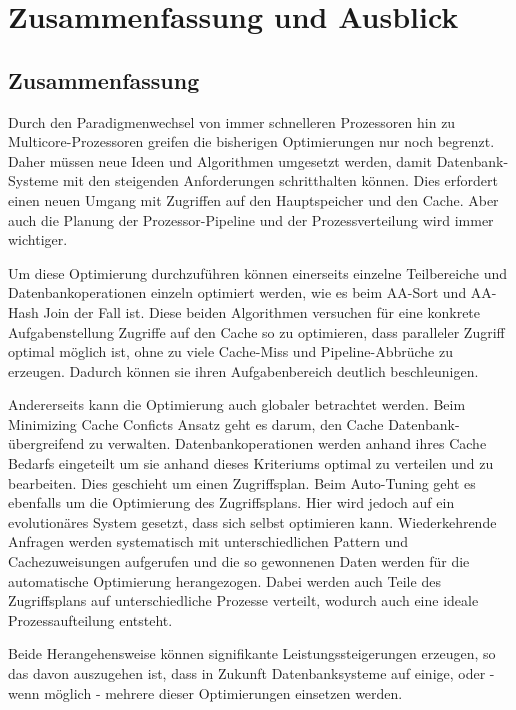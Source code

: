 \chapter{Zusammenfassung und Ausblick}
\label{sec:Zusammenfassung-Ausblick}

\section{Zusammenfassung}
\label{sec:Zusammenfassung}

Durch den Paradigmenwechsel von immer schnelleren Prozessoren hin zu Multicore-Prozessoren greifen die bisherigen Optimierungen nur noch begrenzt. Daher müssen neue Ideen und Algorithmen umgesetzt werden, damit Datenbank-Systeme mit den steigenden Anforderungen schritthalten können. Dies erfordert einen neuen Umgang mit Zugriffen auf den Hauptspeicher und den Cache. Aber auch die Planung der Prozessor-Pipeline und der Prozessverteilung wird immer wichtiger.

Um diese Optimierung durchzuführen können einerseits einzelne Teilbereiche und Datenbankoperationen einzeln optimiert werden, wie es beim AA-Sort und AA-Hash Join der Fall ist. Diese beiden Algorithmen versuchen für eine konkrete Aufgabenstellung Zugriffe auf den Cache so zu optimieren, dass paralleler Zugriff optimal möglich ist, ohne zu viele Cache-Miss und Pipeline-Abbrüche zu erzeugen. Dadurch können sie ihren Aufgabenbereich deutlich beschleunigen.

Andererseits kann die Optimierung auch globaler betrachtet werden. Beim Minimizing Cache Conficts Ansatz geht es darum, den Cache Datenbank-übergreifend zu verwalten. Datenbankoperationen werden anhand ihres Cache Bedarfs eingeteilt um sie anhand dieses Kriteriums optimal zu verteilen und zu bearbeiten. Dies geschieht um einen Zugriffsplan. Beim Auto-Tuning geht es ebenfalls um die Optimierung des Zugriffsplans. Hier wird jedoch auf ein evolutionäres System gesetzt, dass sich selbst optimieren kann. Wiederkehrende Anfragen werden systematisch mit unterschiedlichen Pattern und Cachezuweisungen aufgerufen und die so gewonnenen Daten werden für die automatische Optimierung herangezogen. Dabei werden auch Teile des Zugriffsplans auf unterschiedliche Prozesse verteilt, wodurch auch eine ideale Prozessaufteilung entsteht.

Beide Herangehensweise können signifikante Leistungssteigerungen erzeugen, so das davon auszugehen ist, dass in Zukunft Datenbanksysteme auf einige, oder - wenn möglich - mehrere dieser Optimierungen einsetzen werden.


